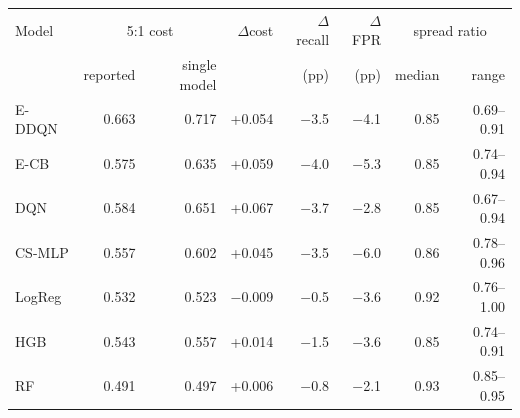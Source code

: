 \begin{tabular}{lrrrrrrr}
\toprule
Model & \multicolumn{2}{c}{5:1 cost} & $\Delta$cost & $\Delta$recall & $\Delta$FPR & \multicolumn{2}{c}{spread ratio} \\
 & reported & single model & & (pp) & (pp) & median & range \\
\midrule
E-DDQN & 0.663 & 0.717 & +0.054 & $-$3.5 & $-$4.1 & 0.85 & 0.69--0.91 \\
E-CB & 0.575 & 0.635 & +0.059 & $-$4.0 & $-$5.3 & 0.85 & 0.74--0.94 \\
DQN & 0.584 & 0.651 & +0.067 & $-$3.7 & $-$2.8 & 0.85 & 0.67--0.94 \\
CS-MLP & 0.557 & 0.602 & +0.045 & $-$3.5 & $-$6.0 & 0.86 & 0.78--0.96 \\
LogReg & 0.532 & 0.523 & $-$0.009 & $-$0.5 & $-$3.6 & 0.92 & 0.76--1.00 \\
HGB & 0.543 & 0.557 & +0.014 & $-$1.5 & $-$3.6 & 0.85 & 0.74--0.91 \\
RF & 0.491 & 0.497 & +0.006 & $-$0.8 & $-$2.1 & 0.93 & 0.85--0.95 \\
\bottomrule
\end{tabular}
